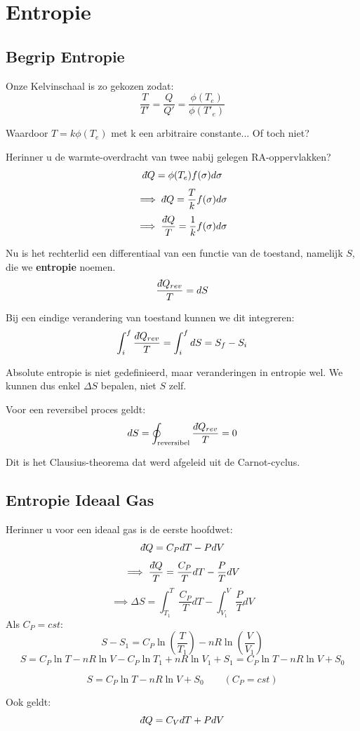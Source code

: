 \section{Entropie}

\subsection{Begrip Entropie}

Onze Kelvinschaal is zo gekozen zodat:
\[
\frac{T}{T'} = \frac{Q}{Q'} = \frac{\phi(T_e)}{\phi(T'_e)}
\]

Waardoor \(T = k \phi (T_e)\) met k een arbitraire constante... Of toch niet?

Herinner u de warmte-overdracht van twee nabij gelegen RA-oppervlakken?
\[
\dbar Q = \phi (T_e) f(\sigma) d\sigma
\]
\[
\implies \dbar Q = \frac{T}{k} f(\sigma) d\sigma
\]
\[\implies \frac{\dbar Q}{T} = \frac{1}{k} f(\sigma) d\sigma \]

Nu is het rechterlid een differentiaal van een functie van de toestand, namelijk \(S\), die we \textbf{entropie} noemen.
\[ \frac{\dbar Q_{rev}}{T} = dS\]

Bij een eindige verandering van toestand kunnen we dit integreren:
\[\int_{i}^{f} \frac{\dbar Q_{rev}}{T} = \int_{i}^{f} dS = S_f - S_i\]

Absolute entropie is niet gedefinieerd, maar veranderingen in entropie wel. We kunnen dus enkel \(\Delta S\) bepalen, niet \(S\) zelf.

Voor een reversibel proces geldt:
\[d S = \oint_{\text{reversibel}}
 \frac{\dbar Q_{rev}}{T} = 0\]

 Dit is het Clausius-theorema dat werd afgeleid uit de Carnot-cyclus.

\subsection{Entropie Ideaal Gas}

Herinner u voor een ideaal gas is de eerste hoofdwet:
\[\dbar Q = C_P dT - P dV\]
\[\implies \frac{\dbar Q}{T} = \frac{C_P}{T} dT - \frac{P}{T} dV\]
\[\implies \Delta S = \int_{T_1}^{T} \frac{C_P}{T} dT - \int_{V_1}^{V} \frac{P}{T} dV\]
Als \(C_P = cst\):
\[ S-S_1 = C_P \ln \left(\frac{T}{T_1}\right) - nR \ln \left(\frac{V}{V_1}\right)\]
\[S = C_P \ln T-nR \ln V -C_P \ln T_1 + nR\ln V_1 + S_1 = C_P\ln T-nR\ln V +S_0 \]

\[\boxed{S = C_P\ln T-nR\ln V + S_0} \qquad (C_P = cst)\]


Ook geldt:
\[\dbar Q = C_V dT + P dV\]

